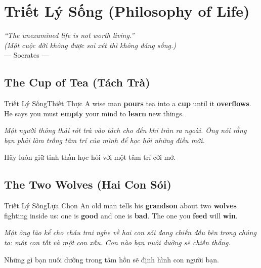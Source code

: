 \chapter{Triết Lý Sống (Philosophy of Life)}

\begin{center}
  \textit{\color{truyenblue}``The unexamined life is not worth living.''}\\
  \textit{(Một cuộc đời không được soi xét thì không đáng sống.)}\\[4pt]
  \small\color{truyengold}--- Socrates ---
\end{center}

\ngancach

\section{The Cup of Tea (Tách Trà)}
\begin{truyen}{Triết Lý Sống}{Thiết Thực}
A wise man \textbf{pours} tea into a \textbf{cup} until it \textbf{overflows}. He says you must \textbf{empty} your mind to \textbf{learn} new things.

\textit{Một người thông thái rót trà vào tách cho đến khi tràn ra ngoài. Ông nói rằng bạn phải làm trống tâm trí của mình để học hỏi những điều mới.}

\begin{baihoc}
Hãy luôn giữ tinh thần học hỏi với một tâm trí cởi mở.
\end{baihoc}
\end{truyen}

\section{The Two Wolves (Hai Con Sói)}
\begin{truyen}{Triết Lý Sống}{Lựa Chọn}
An old man tells his \textbf{grandson} about two \textbf{wolves} fighting inside us: one is \textbf{good} and one is \textbf{bad}. The one you \textbf{feed} will \textbf{win}.

\textit{Một ông lão kể cho cháu trai nghe về hai con sói đang chiến đấu bên trong chúng ta: một con tốt và một con xấu. Con nào bạn nuôi dưỡng sẽ chiến thắng.}

\begin{baihoc}
Những gì bạn nuôi dưỡng trong tâm hồn sẽ định hình con người bạn.
\end{baihoc}
\end{truyen}

